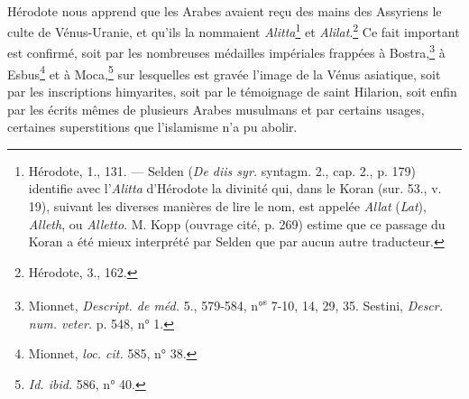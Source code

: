 \documentclass{article}
\begin{document}
\paragraph{}
Hérodote nous apprend que les Arabes avaient reçu des mains des Assyriens le culte de Vénus-Uranie, et qu'ils la nommaient \emph{Alitta}\footnote{Hérodote, 1., 131. --- Selden (\emph{De diis syr.} syntagm. 2., cap. 2., p. 179) identifie avec l'\emph{Alitta} d'Hérodote la divinité qui, dans le Koran (sur. 53., v. 19), suivant les diverses manières de lire le nom, est appelée \emph{Allat} (\emph{Lat}), \emph{Alleth}, ou \emph{Alletto}. M. Kopp (ouvrage cité, p. 269) estime que ce passage du Koran a été mieux interprété par Selden que par aucun autre traducteur.} et \emph{Alilat}.\footnote{Hérodote, 3., 162.} Ce fait important est confirmé, soit par les nombreuses médailles impériales frappées à Bostra,\footnote{Mionnet, \emph{Descript. de méd.} 5., 579-584, n°\textsuperscript{s} 7-10, 14, 29, 35. Sestini, \emph{Descr. num. veter.} p. 548, n° 1.} à Esbus\footnote{Mionnet, \emph{loc. cit.} 585, n° 38.} et à Moca,\footnote{\emph{Id. ibid.} 586, n° 40.} sur lesquelles est gravée l'image de la Vénus asiatique, soit par les inscriptions himyarites, soit par le témoignage de saint Hilarion, soit enfin par les écrits mêmes de plusieurs Arabes musulmans et par certains usages, certaines superstitions que l'islamisme n'a pu abolir.
\end{document}
